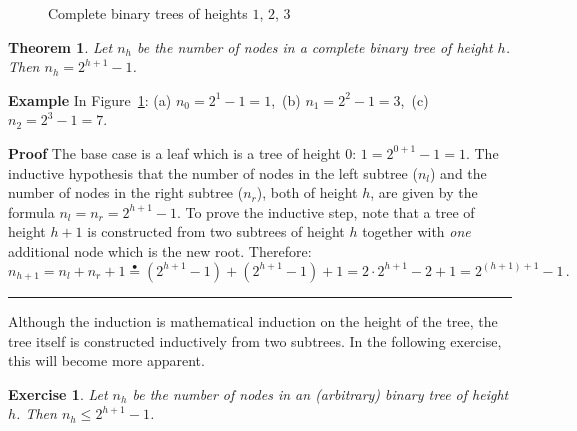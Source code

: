 \documentclass[11pt,a4paper]{report}
\newcommand*{\ih}{\stackrel{\bullet}{=}}
\newcommand*{\qed}{\hfill\rule{1ex}{1.5ex}}
\newcommand*{\qedd}[1]{\vspace*{-#1ex}\qed}
\newtheorem{theorem}{Theorem}
\newtheorem{exercise}{Exercise}
\begin{document}
\begin{figure}[b]
\begin{center}
\caption{Complete binary trees of heights $1$, $2$, $3$}\label{fig.complete}
\end{center}
\end{figure}

\begin{theorem}
Let $n_h$ be the number of nodes in a complete binary tree of
height $h$. Then $n_h = 2^{h+1}-1$.
\end{theorem}

\textbf{Example} In Figure~\ref{fig.complete}: (a) $n_0=2^1-1=1$,$\,$ (b) $n_1 = 2^2-1=3$,$\,$ (c) $n_2 = 2^3-1=7$.

\textbf{Proof} The base case is a leaf which is a tree of height $0$: $1 = 2^{0+1}-1=1$. The inductive hypothesis that the number of nodes in the left subtree ($n_l$) and the number of nodes in the right subtree ($n_r$), both of height $h$, are given by the formula $n_l=n_r=2^{h+1}-1$. To prove the inductive step, note that a tree of height $h+1$ is constructed from two subtrees of height $h$ together with \emph{one} additional node which is the new root. Therefore:
\[
n_{h+1} = n_l + n_r + 1 \ih{} (2^{h+1}-1) + (2^{h+1}-1) + 1 = 2\cdot 2^{h+1} -2 +1= 2^{(h+1)+1} - 1\,.
\]

\qedd{5}

Although the induction is mathematical induction on the height of the tree, the tree itself is constructed inductively from two subtrees. In the following exercise, this will become more apparent.

\begin{exercise}
Let $n_h$ be the number of nodes in an (arbitrary) binary tree of height $h$. Then $n_h\leq 2^{h+1}-1$.
\end{exercise}
\end{document}
